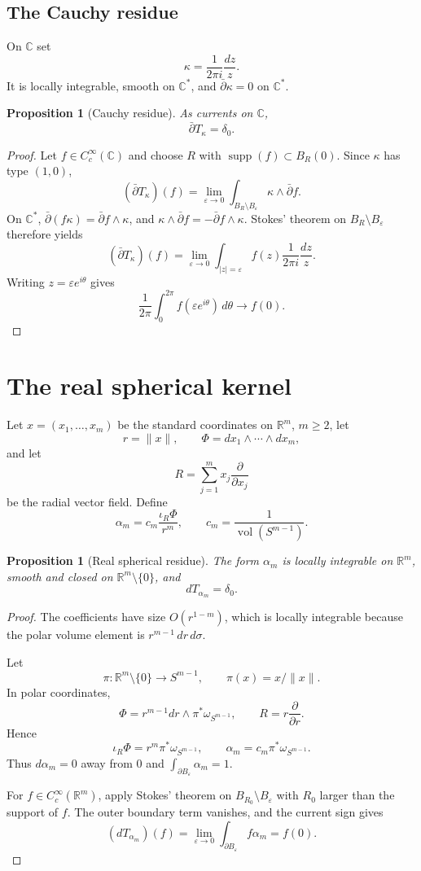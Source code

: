 \documentclass[11pt,a4paper]{article}
\newtheorem{proposition}[theorem]{Proposition}
\theoremstyle{definition}
\theoremstyle{remark}
\newcommand{\C}{\mathbb C}
\newcommand{\R}{\mathbb R}
\newcommand{\supp}{\operatorname{supp}}
\newcommand{\ddbar}{\bar\partial}
\newcommand{\Vol}{\operatorname{vol}}
\begin{document}
\subsection{The Cauchy residue}

On $\C$ set
\[
\kappa=\frac{1}{2\pi i}\frac{dz}{z}.
\]
It is locally integrable, smooth on $\C^*$, and $\ddbar\kappa=0$ on $\C^*$.

\begin{proposition}[Cauchy residue]
As currents on $\C$,
\[
\ddbar T_\kappa=\delta_0.
\]
\end{proposition}

\begin{proof}
Let $f\in C_c^\infty(\C)$ and choose $R$ with $\supp(f)\subset B_R(0)$. Since $\kappa$ has type $(1,0)$,
\[
(\ddbar T_\kappa)(f)=\lim_{\varepsilon\to0}
\int_{B_R\setminus B_\varepsilon}\kappa\wedge\ddbar f.
\]
On $\C^*$, $\ddbar(f\kappa)=\ddbar f\wedge\kappa$, and $\kappa\wedge\ddbar f=-\ddbar f\wedge\kappa$. Stokes' theorem on $B_R\setminus B_\varepsilon$ therefore yields
\[
(\ddbar T_\kappa)(f)
=\lim_{\varepsilon\to0}\int_{|z|=\varepsilon}
 f(z)\frac{1}{2\pi i}\frac{dz}{z}.
\]
Writing $z=\varepsilon e^{i\theta}$ gives
\[
\frac1{2\pi}\int_0^{2\pi}f(\varepsilon e^{i\theta})\,d\theta\longrightarrow f(0).
\]
\end{proof}

\section{The real spherical kernel}

Let $x=(x_1,\dots,x_m)$ be the standard coordinates on $\R^m$, $m\ge2$, let
\[
r=\|x\|,\qquad \Phi=dx_1\wedge\cdots\wedge dx_m,
\]
and let
\[
R=\sum_{j=1}^m x_j\frac{\partial}{\partial x_j}
\]
be the radial vector field. Define
\[
\alpha_m=c_m\frac{\iota_R\Phi}{r^m},
\qquad c_m=\frac1{\Vol(S^{m-1})}.
\]

\begin{proposition}[Real spherical residue]
The form $\alpha_m$ is locally integrable on $\R^m$, smooth and closed on $\R^m\setminus\{0\}$, and
\[
dT_{\alpha_m}=\delta_0.
\]
\end{proposition}

\begin{proof}
The coefficients have size $O(r^{1-m})$, which is locally integrable because the polar volume element is $r^{m-1}\,dr\,d\sigma$.

Let
\[
\pi:\R^m\setminus\{0\}\longrightarrow S^{m-1},\qquad \pi(x)=x/\|x\|.
\]
In polar coordinates,
\[
\Phi=r^{m-1}dr\wedge\pi^*\omega_{S^{m-1}},
\qquad R=r\frac\partial{\partial r}.
\]
Hence
\[
\iota_R\Phi=r^m\pi^*\omega_{S^{m-1}},
\qquad \alpha_m=c_m\pi^*\omega_{S^{m-1}}.
\]
Thus $d\alpha_m=0$ away from $0$ and $\int_{\partial B_\varepsilon}\alpha_m=1$.

For $f\in C_c^\infty(\R^m)$, apply Stokes' theorem on $B_{R_0}\setminus B_\varepsilon$ with $R_0$ larger than the support of $f$. The outer boundary term vanishes, and the current sign gives
\[
(dT_{\alpha_m})(f)=\lim_{\varepsilon\to0}
\int_{\partial B_\varepsilon}f\alpha_m=f(0).
\]
\end{proof}
\end{document}

